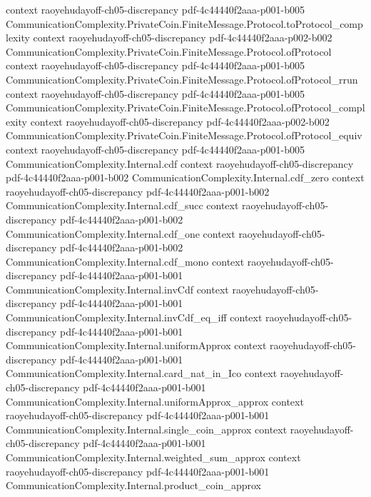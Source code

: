 \begin{lemma}
  {context}
  {raoyehudayoff-ch05-discrepancy}
  {pdf-4c44440f2aaa-p001-b005}
\proofstep
  {CommunicationComplexity.PrivateCoin.FiniteMessage.Protocol.toProtocol_complexity}
  {context}
  {raoyehudayoff-ch05-discrepancy}
  {pdf-4c44440f2aaa-p002-b002}
\proofstep
  {CommunicationComplexity.PrivateCoin.FiniteMessage.Protocol.ofProtocol}
  {context}
  {raoyehudayoff-ch05-discrepancy}
  {pdf-4c44440f2aaa-p001-b005}
\proofstep
  {CommunicationComplexity.PrivateCoin.FiniteMessage.Protocol.ofProtocol_rrun}
  {context}
  {raoyehudayoff-ch05-discrepancy}
  {pdf-4c44440f2aaa-p001-b005}
\proofstep
  {CommunicationComplexity.PrivateCoin.FiniteMessage.Protocol.ofProtocol_complexity}
  {context}
  {raoyehudayoff-ch05-discrepancy}
  {pdf-4c44440f2aaa-p002-b002}
\proofstep
  {CommunicationComplexity.PrivateCoin.FiniteMessage.Protocol.ofProtocol_equiv}
  {context}
  {raoyehudayoff-ch05-discrepancy}
  {pdf-4c44440f2aaa-p001-b005}
\proofstep
  {CommunicationComplexity.Internal.cdf}
  {context}
  {raoyehudayoff-ch05-discrepancy}
  {pdf-4c44440f2aaa-p001-b002}
\proofstep
  {CommunicationComplexity.Internal.cdf_zero}
  {context}
  {raoyehudayoff-ch05-discrepancy}
  {pdf-4c44440f2aaa-p001-b002}
\proofstep
  {CommunicationComplexity.Internal.cdf_succ}
  {context}
  {raoyehudayoff-ch05-discrepancy}
  {pdf-4c44440f2aaa-p001-b002}
\proofstep
  {CommunicationComplexity.Internal.cdf_one}
  {context}
  {raoyehudayoff-ch05-discrepancy}
  {pdf-4c44440f2aaa-p001-b002}
\proofstep
  {CommunicationComplexity.Internal.cdf_mono}
  {context}
  {raoyehudayoff-ch05-discrepancy}
  {pdf-4c44440f2aaa-p001-b001}
\proofstep
  {CommunicationComplexity.Internal.invCdf}
  {context}
  {raoyehudayoff-ch05-discrepancy}
  {pdf-4c44440f2aaa-p001-b001}
\proofstep
  {CommunicationComplexity.Internal.invCdf_eq_iff}
  {context}
  {raoyehudayoff-ch05-discrepancy}
  {pdf-4c44440f2aaa-p001-b001}
\proofstep
  {CommunicationComplexity.Internal.uniformApprox}
  {context}
  {raoyehudayoff-ch05-discrepancy}
  {pdf-4c44440f2aaa-p001-b001}
\proofstep
  {CommunicationComplexity.Internal.card_nat_in_Ico}
  {context}
  {raoyehudayoff-ch05-discrepancy}
  {pdf-4c44440f2aaa-p001-b001}
\proofstep
  {CommunicationComplexity.Internal.uniformApprox_approx}
  {context}
  {raoyehudayoff-ch05-discrepancy}
  {pdf-4c44440f2aaa-p001-b001}
\proofstep
  {CommunicationComplexity.Internal.single_coin_approx}
  {context}
  {raoyehudayoff-ch05-discrepancy}
  {pdf-4c44440f2aaa-p001-b001}
\proofstep
  {CommunicationComplexity.Internal.weighted_sum_approx}
  {context}
  {raoyehudayoff-ch05-discrepancy}
  {pdf-4c44440f2aaa-p001-b001}
\proofstep
  {CommunicationComplexity.Internal.product_coin_approx}

\end{lemma}

